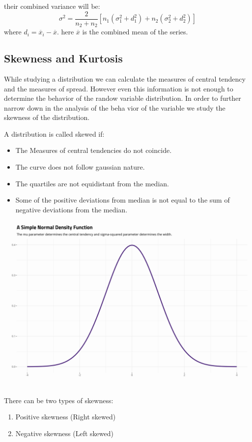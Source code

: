 \documentclass[11pt,letterpaper]{article}
\begin{document}
their combined variance will be: 
\[
  \sigma^2 = \frac{2}{n_2 + n_2} [n_1(\sigma_1^2 + d_1^2) + n_2(\sigma_2^2 + d_2^2)]
\]
where $d_i = \overline{x}_i - \overline{x}$. here $ \overline{x}$ is the combined mean of the series. 

\subsection{Skewness and Kurtosis}

While studying a distribution we can calculate the measures of central tendency and the measures of spread. 
However even this information is not enough to determine the behavior of the randow variable distribution. 
In order to further narrow down in the analysis of the beha vior of the variable we study the skewness of the distribution. 

A distribution is called skewed if: 
\begin{itemize}
  \item The Measures of central tendencies do not coincide. 
  \item The curve does not follow gaussian nature. 
  \item The quartiles are not equidistant from the median. 
  \item Some of the positive deviations from median is not equal to the sum of negative deviations from the median. 
\end{itemize}

\includegraphics[width = \textwidth]{figs/Pasted image.png}

There can be two types of skewness: 
\begin{enumerate}
  \item Positive skewness (Right skewed)
  \item Negative skewness (Left skewed)
\end{enumerate}
\end{document}
